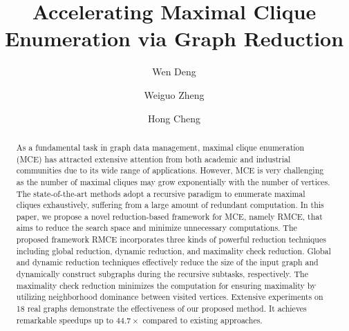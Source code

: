 \documentclass[sigconf, nonacm]{acmart}
\begin{document}
\title{Accelerating Maximal Clique Enumeration via Graph Reduction}

\author{Wen Deng}

\author{Weiguo Zheng}

\author{Hong Cheng}

\begin{abstract}
As a fundamental task in graph data management, maximal clique enumeration (MCE) has attracted extensive attention from both academic and industrial communities due to its wide range of applications. However, MCE is very challenging as the number of maximal cliques may grow exponentially with the number of vertices. The state-of-the-art methods adopt a recursive paradigm to enumerate maximal cliques exhaustively, suffering from a large amount of redundant computation. In this paper, we propose a novel reduction-based framework for MCE, namely RMCE, that aims to reduce the search space and minimize unnecessary computations. The proposed framework RMCE incorporates three kinds of powerful reduction techniques including global reduction, dynamic reduction, and maximality check reduction. Global and dynamic reduction techniques effectively reduce the size of the input graph and dynamically construct subgraphs during the recursive subtasks, respectively. The maximality check reduction minimizes the computation for ensuring maximality by utilizing neighborhood dominance between visited vertices. Extensive experiments on 18 real graphs demonstrate the effectiveness of our proposed method. It achieves remarkable speedups up to $44.7\times$ compared to existing approaches.
\end{abstract}

\maketitle
\end{document}
